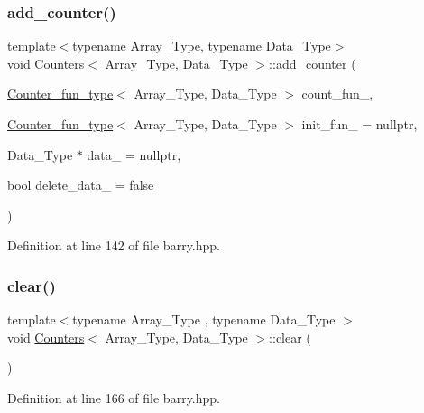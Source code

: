 \subsubsection{\texorpdfstring{add\+\_\+counter()}{add\_counter()}\hspace{0.1cm}{\footnotesize\ttfamily [3/3]}}
{\footnotesize\ttfamily template$<$typename Array\+\_\+\+Type, typename Data\+\_\+\+Type$>$ \\
void \hyperlink{classbarry_1_1_counters}{Counters}$<$ Array\+\_\+\+Type, Data\+\_\+\+Type $>$\+::add\+\_\+counter (\begin{DoxyParamCaption}\item[{\hyperlink{namespacebarry_a89b0a03ea2e7f83f2ae89be70a798337}{Counter\+\_\+fun\+\_\+type}$<$ Array\+\_\+\+Type, Data\+\_\+\+Type $>$}]{count\+\_\+fun\+\_\+,  }\item[{\hyperlink{namespacebarry_a89b0a03ea2e7f83f2ae89be70a798337}{Counter\+\_\+fun\+\_\+type}$<$ Array\+\_\+\+Type, Data\+\_\+\+Type $>$}]{init\+\_\+fun\+\_\+ = {\ttfamily nullptr},  }\item[{Data\+\_\+\+Type $\ast$}]{data\+\_\+ = {\ttfamily nullptr},  }\item[{bool}]{delete\+\_\+data\+\_\+ = {\ttfamily false} }\end{DoxyParamCaption})\hspace{0.3cm}{\ttfamily [inline]}}



Definition at line 142 of file barry.\+hpp.

\mbox{\label{classbarry_1_1_counters_ae4635c154970a13ce88d2e982fe7dab3}} 
\subsubsection{\texorpdfstring{clear()}{clear()}}
{\footnotesize\ttfamily template$<$typename Array\+\_\+\+Type , typename Data\+\_\+\+Type $>$ \\
void \hyperlink{classbarry_1_1_counters}{Counters}$<$ Array\+\_\+\+Type, Data\+\_\+\+Type $>$\+::clear (\begin{DoxyParamCaption}{ }\end{DoxyParamCaption})\hspace{0.3cm}{\ttfamily [inline]}}



Definition at line 166 of file barry.\+hpp.

